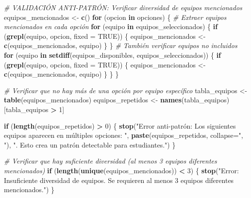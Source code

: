 \documentclass[
]{article}
\newenvironment{Shaded}{\begin{snugshade}}{\end{snugshade}}
\newcommand{\AttributeTok}[1]{\textcolor[rgb]{0.13,0.29,0.53}{#1}}
\newcommand{\CommentTok}[1]{\textcolor[rgb]{0.56,0.35,0.01}{\textit{#1}}}
\newcommand{\ConstantTok}[1]{\textcolor[rgb]{0.56,0.35,0.01}{#1}}
\newcommand{\ControlFlowTok}[1]{\textcolor[rgb]{0.13,0.29,0.53}{\textbf{#1}}}
\newcommand{\DecValTok}[1]{\textcolor[rgb]{0.00,0.00,0.81}{#1}}
\newcommand{\FunctionTok}[1]{\textcolor[rgb]{0.13,0.29,0.53}{\textbf{#1}}}
\newcommand{\NormalTok}[1]{#1}
\newcommand{\OtherTok}[1]{\textcolor[rgb]{0.56,0.35,0.01}{#1}}
\newcommand{\SpecialCharTok}[1]{\textcolor[rgb]{0.81,0.36,0.00}{\textbf{#1}}}
\newcommand{\StringTok}[1]{\textcolor[rgb]{0.31,0.60,0.02}{#1}}
\begin{document}
\begin{Shaded}
\begin{Highlighting}[]
\CommentTok{\# VALIDACIÓN ANTI{-}PATRÓN: Verificar diversidad de equipos mencionados}
\NormalTok{equipos\_mencionados }\OtherTok{\textless{}{-}} \FunctionTok{c}\NormalTok{()}
\ControlFlowTok{for}\NormalTok{ (opcion }\ControlFlowTok{in}\NormalTok{ opciones) \{}
  \CommentTok{\# Extraer equipos mencionados en cada opción}
  \ControlFlowTok{for}\NormalTok{ (equipo }\ControlFlowTok{in}\NormalTok{ equipos\_seleccionados) \{}
    \ControlFlowTok{if}\NormalTok{ (}\FunctionTok{grepl}\NormalTok{(equipo, opcion, }\AttributeTok{fixed =} \ConstantTok{TRUE}\NormalTok{)) \{}
\NormalTok{      equipos\_mencionados }\OtherTok{\textless{}{-}} \FunctionTok{c}\NormalTok{(equipos\_mencionados, equipo)}
\NormalTok{    \}}
\NormalTok{  \}}
  \CommentTok{\# También verificar equipos no incluidos}
  \ControlFlowTok{for}\NormalTok{ (equipo }\ControlFlowTok{in} \FunctionTok{setdiff}\NormalTok{(equipos\_disponibles, equipos\_seleccionados)) \{}
    \ControlFlowTok{if}\NormalTok{ (}\FunctionTok{grepl}\NormalTok{(equipo, opcion, }\AttributeTok{fixed =} \ConstantTok{TRUE}\NormalTok{)) \{}
\NormalTok{      equipos\_mencionados }\OtherTok{\textless{}{-}} \FunctionTok{c}\NormalTok{(equipos\_mencionados, equipo)}
\NormalTok{    \}}
\NormalTok{  \}}
\NormalTok{\}}

\CommentTok{\# Verificar que no hay más de una opción por equipo específico}
\NormalTok{tabla\_equipos }\OtherTok{\textless{}{-}} \FunctionTok{table}\NormalTok{(equipos\_mencionados)}
\NormalTok{equipos\_repetidos }\OtherTok{\textless{}{-}} \FunctionTok{names}\NormalTok{(tabla\_equipos)[tabla\_equipos }\SpecialCharTok{\textgreater{}} \DecValTok{1}\NormalTok{]}

\ControlFlowTok{if}\NormalTok{ (}\FunctionTok{length}\NormalTok{(equipos\_repetidos) }\SpecialCharTok{\textgreater{}} \DecValTok{0}\NormalTok{) \{}
  \FunctionTok{stop}\NormalTok{(}\StringTok{"Error anti{-}patrón: Los siguientes equipos aparecen en múltiples opciones: "}\NormalTok{,}
       \FunctionTok{paste}\NormalTok{(equipos\_repetidos, }\AttributeTok{collapse=}\StringTok{", "}\NormalTok{),}
       \StringTok{". Esto crea un patrón detectable para estudiantes."}\NormalTok{)}
\NormalTok{\}}

\CommentTok{\# Verificar que hay suficiente diversidad (al menos 3 equipos diferentes mencionados)}
\ControlFlowTok{if}\NormalTok{ (}\FunctionTok{length}\NormalTok{(}\FunctionTok{unique}\NormalTok{(equipos\_mencionados)) }\SpecialCharTok{\textless{}} \DecValTok{3}\NormalTok{) \{}
  \FunctionTok{stop}\NormalTok{(}\StringTok{"Error: Insuficiente diversidad de equipos. Se requieren al menos 3 equipos diferentes mencionados."}\NormalTok{)}
\NormalTok{\}}
\end{Highlighting}
\end{Shaded}
\end{document}
